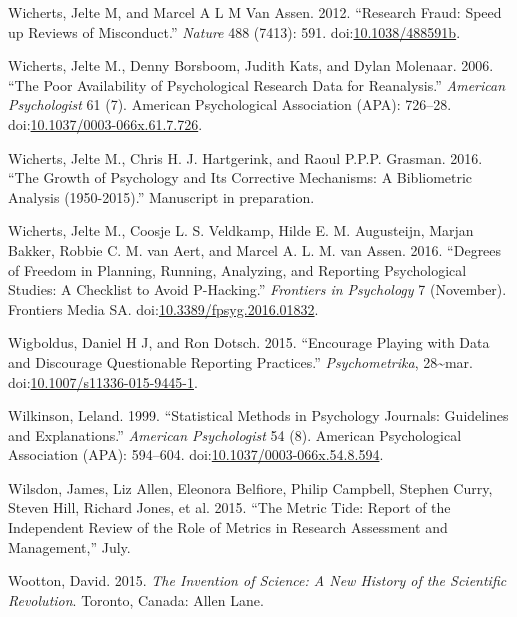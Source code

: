 \documentclass[a5paper]{book}
\begin{document}
\hypertarget{ref-doi:10.1038ux2f488591b}{}
Wicherts, Jelte M, and Marcel A L M Van Assen. 2012. ``Research Fraud:
Speed up Reviews of Misconduct.'' \emph{Nature} 488 (7413): 591.
doi:\href{https://doi.org/10.1038/488591b}{10.1038/488591b}.

\hypertarget{ref-doi:10.1037ux2f0003-066x.61.7.726}{}
Wicherts, Jelte M., Denny Borsboom, Judith Kats, and Dylan Molenaar.
2006. ``The Poor Availability of Psychological Research Data for
Reanalysis.'' \emph{American Psychologist} 61 (7). American
Psychological Association (APA): 726--28.
doi:\href{https://doi.org/10.1037/0003-066x.61.7.726}{10.1037/0003-066x.61.7.726}.

\hypertarget{ref-wicherts2016}{}
Wicherts, Jelte M., Chris H. J. Hartgerink, and Raoul P.P.P. Grasman.
2016. ``The Growth of Psychology and Its Corrective Mechanisms: A
Bibliometric Analysis (1950-2015).'' Manuscript in preparation.

\hypertarget{ref-doi:10.3389ux2ffpsyg.2016.01832}{}
Wicherts, Jelte M., Coosje L. S. Veldkamp, Hilde E. M. Augusteijn,
Marjan Bakker, Robbie C. M. van Aert, and Marcel A. L. M. van Assen.
2016. ``Degrees of Freedom in Planning, Running, Analyzing, and
Reporting Psychological Studies: A Checklist to Avoid P-Hacking.''
\emph{Frontiers in Psychology} 7 (November). Frontiers Media SA.
doi:\href{https://doi.org/10.3389/fpsyg.2016.01832}{10.3389/fpsyg.2016.01832}.

\hypertarget{ref-doi:10.1007ux2fs11336-015-9445-1}{}
Wigboldus, Daniel H J, and Ron Dotsch. 2015. ``Encourage Playing with
Data and Discourage Questionable Reporting Practices.''
\emph{Psychometrika}, 28\textasciitilde{}mar.
doi:\href{https://doi.org/10.1007/s11336-015-9445-1}{10.1007/s11336-015-9445-1}.

\hypertarget{ref-doi:10.1037ux2f0003-066x.54.8.594}{}
Wilkinson, Leland. 1999. ``Statistical Methods in Psychology Journals:
Guidelines and Explanations.'' \emph{American Psychologist} 54 (8).
American Psychological Association (APA): 594--604.
doi:\href{https://doi.org/10.1037/0003-066x.54.8.594}{10.1037/0003-066x.54.8.594}.

\hypertarget{ref-doi:10.13140ux2fRG.2.1.4929.1363}{}
Wilsdon, James, Liz Allen, Eleonora Belfiore, Philip Campbell, Stephen
Curry, Steven Hill, Richard Jones, et al. 2015. ``The Metric Tide:
Report of the Independent Review of the Role of Metrics in Research
Assessment and Management,'' July.

\hypertarget{ref-isbn:9781846142109}{}
Wootton, David. 2015. \emph{The Invention of Science: A New History of
the Scientific Revolution}. Toronto, Canada: Allen Lane.
\end{document}

